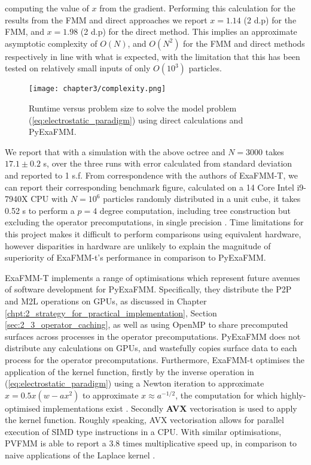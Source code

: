 computing the value of $x$ from the gradient. Performing this calculation for the
results from the \gls{FMM} and direct approaches we report $x=1.14$ (2 d.p) for
the FMM, and $x=1.98$ (2 d.p) for the direct method. This implies an approximate
asymptotic complexity of $O(N)$, and $O(N^2)$ for the \gls{FMM} and direct methods
respectively in line with what is expected, with the limitation that this has
been tested on relatively small inputs of only $O(10^3)$ particles.

\begin{figure}[ht]
    \centering

  {\texttt{[image: chapter3/complexity.png]}}
  \vspace{0pt}
    \caption{
        Runtime versus problem size to solve the model problem
        (\ref{eq:electrostatic_paradigm}) using direct calculations and
        \gls{PyExaFMM}.
    }
    \label{fig:3_1_complexity}
\end{figure}

We report that with a simulation with the above octree and
$N=3000$ takes $17.1 \pm 0.2$ s, over the three runs with
error calculated from standard deviation and reported to 1 s.f. From correspondence
with the authors of ExaFMM-T, we can report their corresponding benchmark figure,
calculated on a 14 Core Intel i9-7940X \gls{CPU} with $N=10^6$ particles
randomly distributed in a unit cube, it takes 0.52 s to perform a $p=4$ degree
computation, including tree construction but excluding the
operator precomputations, in single precision \cite{exafmm}. Time limitations for this project
makes it difficult to perform comparisons using equivalent hardware, however
disparities in hardware are unlikely to explain the magnitude of superiority
of ExaFMM-t's performance in comparison to \gls{PyExaFMM}.

ExaFMM-T implements a range of optimisations which represent future avenues
of software development for \gls{PyExaFMM}. Specifically, they distribute the
\gls{P2P} and \gls{M2L} operations on \gls{GPU}s, as discussed in Chapter
\ref{chpt:2_strategy_for_practical_implementation},
Section \ref{sec:2_3_operator_caching}, as well as using \gls{OpenMP} to share
precomputed surfaces across processes in the operator precomputations.
\gls{PyExaFMM} does not distribute any calculations on \gls{GPU}s, and
wastefully copies surface data to each process for the operator precomputations.
Furthermore, ExaFMM-t optimises the application of the kernel function,
firstly by the inverse operation in (\ref{eq:electrostatic_paradigm}) using a Newton
iteration to approximate $x = 0.5x(w-ax^2)$ to approximate $x \approx a ^{-1/2}$,
the computation for which highly-optimised implementations exist
\cite{Lomont:2003, sqrt}. Secondly \textbf{\gls{AVX}} vectorisation is used
to apply the kernel function. Roughly speaking, \gls{AVX} vectorisation allows
for parallel execution of \gls{SIMD} type instructions in a \gls{CPU}. With similar
optimisations, PVFMM is able to report a 3.8 times multiplicative speed up, in
comparison to naive applications of the Laplace kernel \cite{Malhotra:2015:CCP}.

